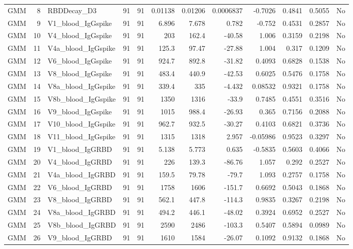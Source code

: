 \begin{longtable}{lrp{}rrrrrrrrl}
GMM & 8 & RBDDecay\_D3 & 91 & 91 & 0.01138 & 0.01206 & 0.0006837 & -0.7026 & 0.4841 & 0.5055 & No \\
GMM & 9 & V1\_blood\_IgGspike & 91 & 91 & 6.896 & 7.678 & 0.782 & -0.752 & 0.4531 & 0.2857 & No \\
GMM & 10 & V4\_blood\_IgGspike & 91 & 91 & 203 & 162.4 & -40.58 & 1.006 & 0.3159 & 0.2198 & No \\
GMM & 11 & V4a\_blood\_IgGspike & 91 & 91 & 125.3 & 97.47 & -27.88 & 1.004 & 0.317 & 0.1209 & No \\
GMM & 12 & V6\_blood\_IgGspike & 91 & 91 & 924.7 & 892.8 & -31.82 & 0.4093 & 0.6828 & 0.1538 & No \\
GMM & 13 & V8\_blood\_IgGspike & 91 & 91 & 483.4 & 440.9 & -42.53 & 0.6025 & 0.5476 & 0.1758 & No \\
GMM & 14 & V8a\_blood\_IgGspike & 91 & 91 & 339.4 & 335 & -4.432 & 0.08532 & 0.9321 & 0.1758 & No \\
GMM & 15 & V8b\_blood\_IgGspike & 91 & 91 & 1350 & 1316 & -33.9 & 0.7485 & 0.4551 & 0.3516 & No \\
GMM & 16 & V9\_blood\_IgGspike & 91 & 91 & 1015 & 988.4 & -26.93 & 0.365 & 0.7156 & 0.2088 & No \\
GMM & 17 & V10\_blood\_IgGspike & 91 & 91 & 962.7 & 932.5 & -30.27 & 0.4103 & 0.6821 & 0.3736 & No \\
GMM & 18 & V11\_blood\_IgGspike & 91 & 91 & 1315 & 1318 & 2.957 & -0.05986 & 0.9523 & 0.3297 & No \\
GMM & 19 & V1\_blood\_IgGRBD & 91 & 91 & 5.138 & 5.773 & 0.635 & -0.5835 & 0.5603 & 0.4066 & No \\
GMM & 20 & V4\_blood\_IgGRBD & 91 & 91 & 226 & 139.3 & -86.76 & 1.057 & 0.292 & 0.2527 & No \\
GMM & 21 & V4a\_blood\_IgGRBD & 91 & 91 & 159.5 & 79.78 & -79.7 & 1.093 & 0.2757 & 0.1758 & No \\
GMM & 22 & V6\_blood\_IgGRBD & 91 & 91 & 1758 & 1606 & -151.7 & 0.6692 & 0.5043 & 0.1868 & No \\
GMM & 23 & V8\_blood\_IgGRBD & 91 & 91 & 562.1 & 447.8 & -114.3 & 0.9835 & 0.3267 & 0.2198 & No \\
GMM & 24 & V8a\_blood\_IgGRBD & 91 & 91 & 494.2 & 446.1 & -48.02 & 0.3924 & 0.6952 & 0.2527 & No \\
GMM & 25 & V8b\_blood\_IgGRBD & 91 & 91 & 2590 & 2486 & -103.3 & 0.5407 & 0.5894 & 0.0989 & No \\
GMM & 26 & V9\_blood\_IgGRBD & 91 & 91 & 1610 & 1584 & -26.07 & 0.1092 & 0.9132 & 0.1868 & No \\

\end{longtable}
